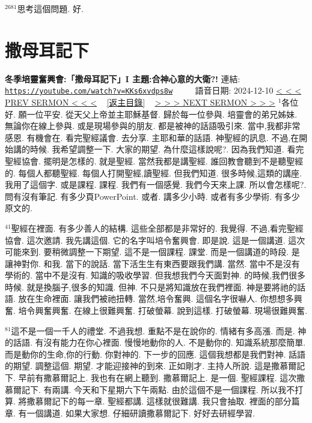 \documentclass{book}
\begin{document}
$^{2681}$思考這個問題.
好.
\newpage



\section{撒母耳記下}
\label{sec:KKs6xvdps8w}
\textbf{冬季培靈奮興會:「撒母耳記下」I  主題:合神心意的大衛?!}
\newline
\newline
連結: \href{https://youtube.com/watch?v=KKs6xvdps8w}{\texttt{https://youtube.com/watch?v=KKs6xvdps8w}} ~~~~ 語音日期: 2024-12-10
\newline
\newline
\hyperref[sec:7tQS0En6sh8]{\small{< < < PREV SERMON < < <}}
~
\hyperref[sec:index]{\small{[返主目錄]}}
~
\hyperref[sec:_dFYhclLeWU]{\small{> > > NEXT SERMON > > >}}
\newline
\newline
$^{1}$各位好.
願一位平安.
從天父上帝並主耶穌基督.
歸於每一位參與.
培靈會的弟兄姊妹.
無論你在線上參與.
或是現場參與的朋友.
都是被神的話語吸引來.
當中,我都非常感恩.
有機會在.
看完聖經議會.
去分享.
主耶和華的話語.
神聖經的訊息.
不過,在開始講的時候.
我希望調整一下.
大家的期望.
為什麼這樣說呢?.
因為我們知道.
看完聖經協會.
擺明是怎樣的.
就是聖經.
當然我都是講聖經.
誰回教會聽到不是聽聖經的.
每個人都聽聖經.
每個人打開聖經,讀聖經.
但我們知道.
很多時候,這類的講座.
我用了這個字.
或是課程.
課程.
我們有一個感覺.
我們今天來上課.
所以會怎樣呢?.
問有沒有筆記.
有多少頁PowerPoint.
或者.
講多少小時.
或者有多少學術.
有多少原文的.

$^{41}$聖經在裡面.
有多少善人的結構.
這些全部都是非常好的.
我覺得.
不過,看完聖經協會.
這次邀請.
我先講這個.
它的名字叫培令奮興會.
即是說.
這是一個講道.
這次可能來到.
要稍微調整一下期望.
這不是一個課程.
課堂.
而是一個講道的時段.
是讓神對你.
和我.
當下的說話.
當下活生生有東西要跟我們講.
當然.
當中不是沒有學術的.
當中不是沒有.
知識的吸收學習.
但我想我們今天面對神.
的時候,我們很多時候.
就是換腦子,很多的知識.
但神.
不只是將知識放在我們裡面.
神是要將祂的話語.
放在生命裡面.
讓我們被祂扭轉.
當然,培令奮興.
這個名字很嚇人.
你想想多興奮.
培令興奮興奮.
在線上很難興奮.
打破螢幕.
說到這樣.
打破螢幕.
現場很難興奮.

$^{81}$這不是一個一千人的禮堂.
不過我想.
重點不是在說你的.
情緒有多高漲.
而是.
神的話語.
有沒有能力在你心裡面.
慢慢地動你的人.
不是動你的.
知識系統那麼簡單.
而是動你的生命,你的行動.
你對神的.
下一步的回應.
這個我想都是我們對神.
話語的期望.
調整這個.
期望.
才能迎接神的到來.
正如剛才.
主持人所說.
這是撒慕爾記下.
早前有撒慕爾記上.
我也有在網上聽到.
撒慕爾記上.
是一個.
聖經課程.
這次撒慕爾記下.
有兩講.
今天和下星期六下午兩點.
由於這個不是一個課程.
所以我不打算.
將撒慕爾記下的每一章.
聖經都講.
這樣就很難講.
我只會抽取.
裡面的部分篇章.
有一個講道.
如果大家想.
仔細研讀撒慕爾記下.
好好去研經學習.
\end{document}
